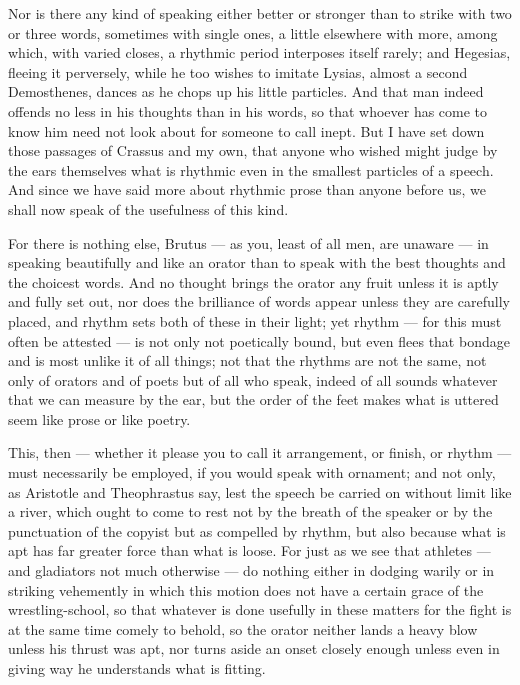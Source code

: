  Nor is there any kind of speaking either better or stronger than to strike with two or three words, sometimes with single ones, a little elsewhere with more, among which, with varied closes, a rhythmic period interposes itself rarely; and Hegesias, fleeing it perversely, while he too wishes to imitate Lysias, almost a second Demosthenes, dances as he chops up his little particles. And that man indeed offends no less in his thoughts than in his words, so that whoever has come to know him need not look about for someone to call inept. But I have set down those passages of Crassus and my own, that anyone who wished might judge by the ears themselves what is rhythmic even in the smallest particles of a speech. And since we have said more about rhythmic prose than anyone before us, we shall now speak of the usefulness of this kind.

 For there is nothing else, Brutus — as you, least of all men, are unaware — in speaking beautifully and like an orator than to speak with the best thoughts and the choicest words. And no thought brings the orator any fruit unless it is aptly and fully set out, nor does the brilliance of words appear unless they are carefully placed, and rhythm sets both of these in their light; yet rhythm — for this must often be attested — is not only not poetically bound, but even flees that bondage and is most unlike it of all things; not that the rhythms are not the same, not only of orators and of poets but of all who speak, indeed of all sounds whatever that we can measure by the ear, but the order of the feet makes what is uttered seem like prose or like poetry.

 This, then — whether it please you to call it arrangement, or finish, or rhythm — must necessarily be employed, if you would speak with ornament; and not only, as Aristotle and Theophrastus say, lest the speech be carried on without limit like a river, which ought to come to rest not by the breath of the speaker or by the punctuation of the copyist but as compelled by rhythm, but also because what is apt has far greater force than what is loose. For just as we see that athletes — and gladiators not much otherwise — do nothing either in dodging warily or in striking vehemently in which this motion does not have a certain grace of the wrestling-school, so that whatever is done usefully in these matters for the fight is at the same time comely to behold, so the orator neither lands a heavy blow unless his thrust was apt, nor turns aside an onset closely enough unless even in giving way he understands what is fitting.

